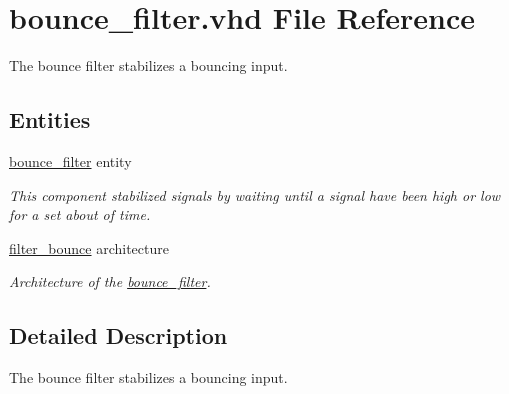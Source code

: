 \hypertarget{bounce__filter_8vhd}{\section{bounce\-\_\-filter.\-vhd File Reference}
\label{bounce__filter_8vhd}
}


The bounce filter stabilizes a bouncing input.  


\subsection*{Entities}
\begin{DoxyCompactItemize}
\item 
\hyperlink{classbounce__filter}{bounce\-\_\-filter} entity
\begin{DoxyCompactList}\small\item\em This component stabilized signals by waiting until a signal have been high or low for a set about of time. \end{DoxyCompactList}\item 
\hyperlink{classbounce__filter_1_1filter__bounce}{filter\-\_\-bounce} architecture
\begin{DoxyCompactList}\small\item\em Architecture of the \hyperlink{classbounce__filter}{bounce\-\_\-filter}. \end{DoxyCompactList}\end{DoxyCompactItemize}


\subsection{Detailed Description}
The bounce filter stabilizes a bouncing input. 